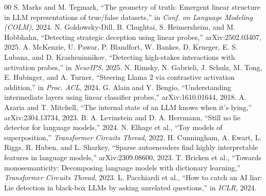 \documentclass[conference]{IEEEtran}
\begin{document}
\begin{thebibliography}{00}
 S. Marks and M. Tegmark, ``The geometry of truth: Emergent
linear structure in LLM representations of true/false datasets,'' in
\emph{Conf. on Language Modeling (COLM)}, 2024.
 N. Goldowsky-Dill, B. Chughtai, S. Heimersheim, and
M. Hobbhahn, ``Detecting strategic deception using linear probes,''
arXiv:2502.03407, 2025.
 A. McKenzie, U. Pawar, P. Blandfort, W. Bankes,
D. Krueger, E. S. Lubana, and D. Krasheninnikov, ``Detecting high-stakes
interactions with activation probes,'' in \emph{NeurIPS}, 2025.
 N. Rimsky, N. Gabrieli, J. Schulz, M. Tong, E. Hubinger,
and A. Turner, ``Steering Llama 2 via contrastive activation addition,'' in
\emph{Proc. ACL}, 2024.
 G. Alain and Y. Bengio, ``Understanding intermediate layers
using linear classifier probes,'' arXiv:1610.01644, 2018.
 A. Azaria and T. Mitchell, ``The internal state of an LLM
knows when it's lying,'' arXiv:2304.13734, 2023.
 B. A. Levinstein and D. A. Herrmann, ``Still no lie
detector for language models,'' 2024.
 N. Elhage et al., ``Toy models of superposition,''
\emph{Transformer Circuits Thread}, 2022.
 H. Cunningham, A. Ewart, L. Riggs, R. Huben, and
L. Sharkey, ``Sparse autoencoders find highly interpretable features in
language models,'' arXiv:2309.08600, 2023.
 T. Bricken et al., ``Towards monosemanticity: Decomposing
language models with dictionary learning,'' \emph{Transformer Circuits Thread},
2023.
 L. Pacchiardi et al., ``How to catch an AI liar:
Lie detection in black-box LLMs by asking unrelated questions,'' in \emph{ICLR},
2024.
\end{thebibliography}
\end{document}
